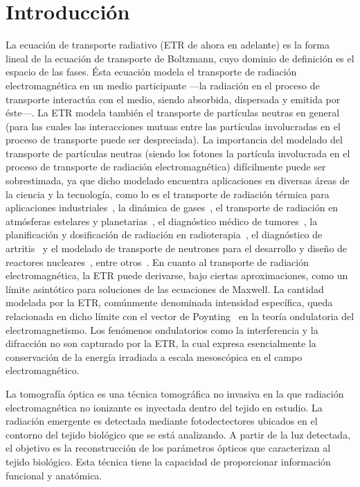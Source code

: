 \chapter{Introducción}
\lhead{\thepage}
\vspace{0.01\textheight}
\pagebreak
La ecuación de transporte radiativo (ETR de ahora en adelante) es la forma lineal de la ecuación de transporte de Boltzmann, 
cuyo dominio de definición es el espacio de las fases. Ésta ecuación modela el transporte 
de radiación electromagnética en un medio participante ---la radiación en el proceso de transporte 
interactúa con el medio, siendo absorbida, dispersada y emitida por éste---. La ETR modela también el transporte de partículas neutras en
 general (para las cuales las interacciones mutuas entre las partículas involucradas 
 en el proceso de transporte puede ser despreciada). La importancia del modelado del transporte de 
 partículas neutras (siendo los fotones la partícula involucrada en el proceso de transporte de 
 radiación electromagnética) difícilmente puede ser sobrestimada, ya que dicho modelado encuentra aplicaciones en diversas
 áreas de la ciencia y la tecnología, como lo es el transporte de radiación 
 térmica para aplicaciones industriales~\cite{Howell2010, Thynell1998}, la dinámica de 
 gases~\cite{Duderstadt1979}, el transporte de radiación en atmósferas estelares y 
 planetarias~\cite{Qin2015, Dymond1997, Chandrasekhar1960}, el diagnóstico médico de 
 tumores~\cite{Zhu2005, Zhu2010, Fujii2016b}, la planificación y dosificación 
 de radiación en radioterapia~\cite{Vassiliev2010,Bedford2019}, el diagnóstico de artritis~\cite{Klose2002, Netz2001} 
 y el modelado de transporte de neutrones para el desarrollo 
 y diseño de reactores nucleares~\cite{Larsen2006, Sanchez1982, Anli2006}, entre otros~\cite {Mishchenko1999, Prasher2003}. 
 En cuanto al transporte de radiación electromagnética, la ETR puede derivarse, bajo ciertas aproximaciones, como un límite asintótico 
 para soluciones de las ecuaciones de Maxwell. La cantidad modelada por la ETR, comúnmente denominada 
 intensidad específica, queda relacionada en dicho límite con el vector de Poynting~\cite{Mishchenko2002, Ripoll2011} 
 en la teoría ondulatoria del electromagnetismo. Los fenómenos ondulatorios como la interferencia y la difracción no son
 capturado por la ETR, la cual expresa esencialmente la conservación de la
 energía irradiada a escala mesoscópica en el campo electromagnético.

 La tomografía óptica es una técnica tomográfica no invasiva en la que
 radiación electromagnética no ionizante es inyectada dentro del tejido en estudio.
 La radiación emergente es detectada mediante fotodectectores 
 ubicados en el contorno del tejido biológico que se está analizando. A
  partir de la luz detectada, el objetivo es la reconstrucción de
 los parámetros ópticos que caracterizan al tejido biológico. Esta técnica 
 tiene la capacidad de proporcionar información funcional y anatómica. 
 

